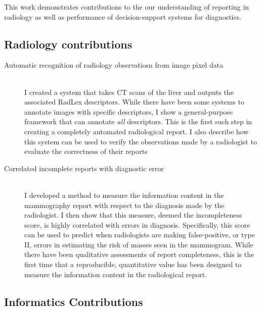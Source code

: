 This work demonstrates contributions to the our understanding of reporting in radiology as well as performance of decision-support systems for diagnostics.

\subsection{Radiology contributions}

\begin{description}
	\item[Automatic recognition of radiology observatiosn from image pixel data] \hfill \\
	I created a system that takes CT scans of the liver and outputs the associated RadLex descriptors. While there have been some systems to annotate images with specific descriptors, I show a general-purpose framework that can annotate \emph{all} descriptors. This is the first such step in creating a completely automated radiological report. I also describe how this system can be used to verify the observations made by a radiologist to evaluate the correctness of their reports
	
	\item[Correlated incomplete reports with diagnostic error] \hfill \\
	I developed a method to measure the information content in the mammography report with respect to the diagnosis made by the radiologist. I then show that this measure, deemed the incompleteness score, is highly correlated with errors in diagnosis. Specifically, this score can be used to predict when radiologists are making false-positive, or type II, errors in estimating the risk of masses seen in the mammogram. While there have been qualitative assessments of report completeness, this is the first time that a reproducible, quantitative value has been designed to measure the information content in the radiological report.
\end{description}



\subsection{Informatics Contributions}

